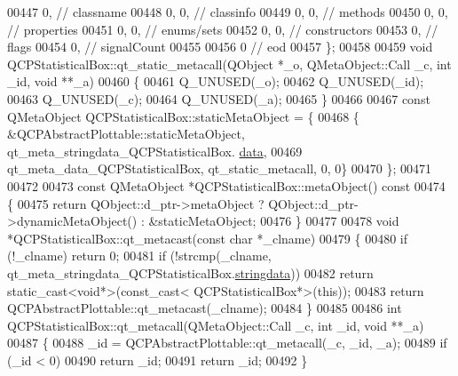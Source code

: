 \begin{DoxyCode}
00447        0,       \textcolor{comment}{// classname}
00448        0,    0, \textcolor{comment}{// classinfo}
00449        0,    0, \textcolor{comment}{// methods}
00450        0,    0, \textcolor{comment}{// properties}
00451        0,    0, \textcolor{comment}{// enums/sets}
00452        0,    0, \textcolor{comment}{// constructors}
00453        0,       \textcolor{comment}{// flags}
00454        0,       \textcolor{comment}{// signalCount}
00455 
00456        0        \textcolor{comment}{// eod}
00457 \};
00458 
00459 \textcolor{keywordtype}{void} QCPStatisticalBox::qt\_static\_metacall(QObject *\_o, QMetaObject::Call \_c, \textcolor{keywordtype}{int} \_id, \textcolor{keywordtype}{void} **\_a)
00460 \{
00461     Q\_UNUSED(\_o);
00462     Q\_UNUSED(\_id);
00463     Q\_UNUSED(\_c);
00464     Q\_UNUSED(\_a);
00465 \}
00466 
00467 \textcolor{keyword}{const} QMetaObject QCPStatisticalBox::staticMetaObject = \{
00468     \{ &QCPAbstractPlottable::staticMetaObject, qt\_meta\_stringdata\_QCPStatisticalBox.
      \hyperlink{a00016_a5e26535af2751ed72a5c0a296eff07f6}{data},
00469       qt\_meta\_data\_QCPStatisticalBox,  qt\_static\_metacall, 0, 0\}
00470 \};
00471 
00472 
00473 \textcolor{keyword}{const} QMetaObject *QCPStatisticalBox::metaObject()\textcolor{keyword}{ const}
00474 \textcolor{keyword}{}\{
00475     \textcolor{keywordflow}{return} QObject::d\_ptr->metaObject ? QObject::d\_ptr->dynamicMetaObject() : &staticMetaObject;
00476 \}
00477 
00478 \textcolor{keywordtype}{void} *QCPStatisticalBox::qt\_metacast(\textcolor{keyword}{const} \textcolor{keywordtype}{char} *\_clname)
00479 \{
00480     \textcolor{keywordflow}{if} (!\_clname) \textcolor{keywordflow}{return} 0;
00481     \textcolor{keywordflow}{if} (!strcmp(\_clname, qt\_meta\_stringdata\_QCPStatisticalBox.\hyperlink{a00016_a69ea5a8754685d08ddf21f3f6478bb52}{stringdata}))
00482         \textcolor{keywordflow}{return} \textcolor{keyword}{static\_cast<}\textcolor{keywordtype}{void}*\textcolor{keyword}{>}(\textcolor{keyword}{const\_cast<} QCPStatisticalBox*\textcolor{keyword}{>}(\textcolor{keyword}{this}));
00483     \textcolor{keywordflow}{return} QCPAbstractPlottable::qt\_metacast(\_clname);
00484 \}
00485 
00486 \textcolor{keywordtype}{int} QCPStatisticalBox::qt\_metacall(QMetaObject::Call \_c, \textcolor{keywordtype}{int} \_id, \textcolor{keywordtype}{void} **\_a)
00487 \{
00488     \_id = QCPAbstractPlottable::qt\_metacall(\_c, \_id, \_a);
00489     \textcolor{keywordflow}{if} (\_id < 0)
00490         \textcolor{keywordflow}{return} \_id;
00491     \textcolor{keywordflow}{return} \_id;
00492 \}

\end{DoxyCode}
